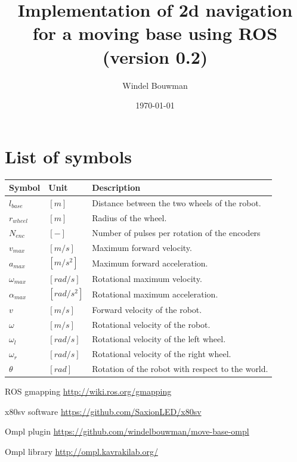 \documentclass[a4paper]{article}
\begin{document}
\title{Implementation of 2d navigation for a moving base using ROS
(version 0.2)
}
\date{\today}
\author{Windel Bouwman}

\maketitle

\tableofcontents

\section*{List of symbols}

\begin{tabular}{ | l | l | l | }
  \hline                       
  Symbol & Unit & Description \\
  \hline                       
  $l_{base}$ & $[m]$ & Distance between the two wheels of the robot. \\
  \hline                       
  $r_{wheel}$ & $[m]$ & Radius of the wheel. \\
  \hline                       
  $N_{enc}$ & $[-]$ & Number of pulses per rotation of the encoders \\
  \hline                       
  $v_{max}$ & $[m/s]$ & Maximum forward velocity. \\
  \hline                       
  $a_{max}$ & $[m/s^2]$ & Maximum forward acceleration. \\
  \hline                       
  $\omega_{max}$ & $[rad/s]$ & Rotational maximum velocity. \\
  \hline                       
  $\alpha_{max}$ & $[rad/s^2]$ & Rotational maximum acceleration. \\
  \hline                       
  $v$ & $[m/s]$ & Forward velocity of the robot. \\
  \hline                       
  $\omega$ & $[m/s]$ & Rotational velocity of the robot. \\
  \hline                       
  $\omega_l$ & $[rad/s]$ & Rotational velocity of the left wheel. \\
  \hline                       
  $\omega_r$ & $[rad/s]$ & Rotational velocity of the right wheel. \\
  \hline                       
  $\theta$ & $[rad]$ & Rotation of the robot with respect to the world. \\
  \hline                       
\end{tabular}

\begin{thebibliography}{1}

   ROS gmapping \url{http://wiki.ros.org/gmapping}

   x80sv software \url{https://github.com/SaxionLED/x80sv}

   Ompl plugin
\url{https://github.com/windelbouwman/move-base-ompl}

   Ompl library \url{http://ompl.kavrakilab.org/}

\end{thebibliography}
\end{document}
